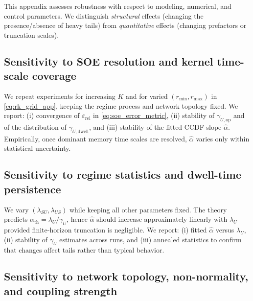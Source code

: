 \documentclass[12pt,a4paper]{article}
\theoremstyle{definition}
\theoremstyle{remark}
\begin{document}
This appendix assesses robustness with respect to modeling, numerical, and control parameters. We distinguish \emph{structural} effects
(changing the presence/absence of heavy tails) from \emph{quantitative} effects (changing prefactors or truncation scales).

\subsection{Sensitivity to SOE resolution and kernel time-scale coverage}
\label{app:sens_soe}

We repeat experiments for increasing $K$ and for varied $(r_{\min},r_{\max})$ in \eqref{eq:rk_grid_app}, keeping the regime process and network topology fixed.
We report: (i) convergence of $\varepsilon_{\mathrm{rel}}$ in \eqref{eq:soe_error_metric}, (ii) stability of $\gamma_{U,\mathrm{op}}$ and of the distribution of
$\widehat{\gamma}_{U,\mathrm{dwell}}$, and (iii) stability of the fitted CCDF slope $\widehat{\alpha}$.
Empirically, once dominant memory time scales are resolved, $\widehat{\alpha}$ varies only within statistical uncertainty.

\subsection{Sensitivity to regime statistics and dwell-time persistence}
\label{app:sens_regime}

We vary $(\lambda_{SU},\lambda_{US})$ while keeping all other parameters fixed.
The theory predicts $\alpha_{\mathrm{th}}=\lambda_U/\gamma_U$, hence $\widehat{\alpha}$ should increase approximately linearly with $\lambda_U$ provided finite-horizon truncation is negligible.
We report: (i) fitted $\widehat{\alpha}$ versus $\lambda_U$, (ii) stability of $\gamma_U$ estimates across runs, and (iii) annealed statistics to confirm that changes affect tails rather than typical behavior.

\subsection{Sensitivity to network topology, non-normality, and coupling strength}
\label{app:sens_network}
\end{document}
